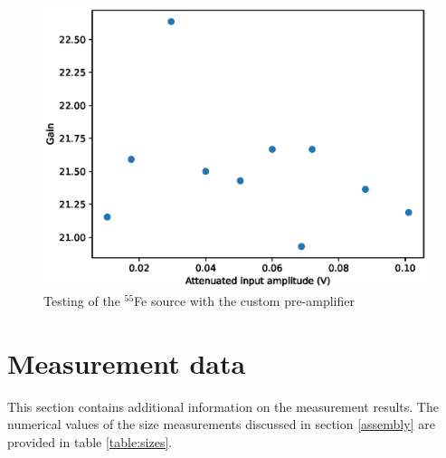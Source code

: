 \documentclass[a4paper]{article}
\begin{document}
\begin{appendices}
\begin{figure}[ht!]
\centering
\includegraphics[width=\textwidth]{fig/python/preamp_gain}
\caption{Testing of the $^{55}$Fe source with the custom pre-amplifier}
\label{fig:pre_amp_testing}
\end{figure}



\clearpage
\section{Measurement data}
This section contains additional information on the measurement results.
The numerical values of the size measurements discussed in section \ref{assembly} are provided in table \ref{table:sizes}.


\end{appendices}
\end{document}
